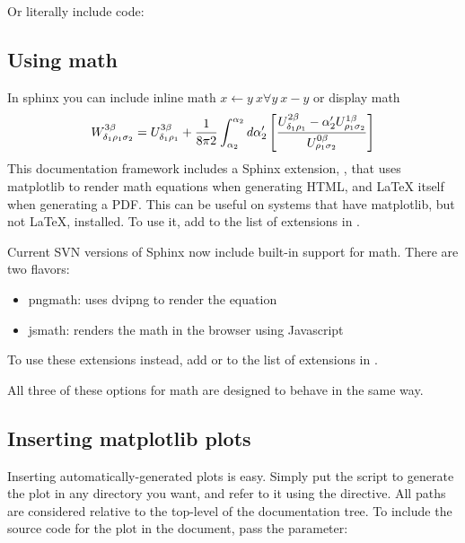 \documentclass[letterpaper,10pt,openany, oneside]{sphinxmanual}
\begin{document}
Or literally include code:


\subsection{Using math}
\label{sample:id5}\label{sample:using-math}
In sphinx you can include inline math $x\leftarrow y\ x\forall
y\ x-y$ or display math
\begin{gather}
\begin{split}W^{3\beta}_{\delta_1 \rho_1 \sigma_2} = U^{3\beta}_{\delta_1 \rho_1} + \frac{1}{8 \pi 2} \int^{\alpha_2}_{\alpha_2} d \alpha^\prime_2 \left[\frac{ U^{2\beta}_{\delta_1 \rho_1} - \alpha^\prime_2U^{1\beta}_{\rho_1 \sigma_2} }{U^{0\beta}_{\rho_1 \sigma_2}}\right]\end{split}\notag
\end{gather}
This documentation framework includes a Sphinx extension,
, that uses matplotlib to render math
equations when generating HTML, and LaTeX itself when generating a
PDF.  This can be useful on systems that have matplotlib, but not
LaTeX, installed.  To use it, add  to the list of
extensions in .

Current SVN versions of Sphinx now include built-in support for math.
There are two flavors:
\begin{itemize}
\item {} 
pngmath: uses dvipng to render the equation

\item {} 
jsmath: renders the math in the browser using Javascript

\end{itemize}

To use these extensions instead, add  or
 to the list of extensions in .

All three of these options for math are designed to behave in the same
way.


\subsection{Inserting matplotlib plots}
\label{sample:inserting-matplotlib-plots}
Inserting automatically-generated plots is easy.  Simply put the script to
generate the plot in any directory you want, and refer to it using the 
directive.  All paths are considered relative to the top-level of the
documentation tree.  To include the source code for the plot in the document,
pass the  parameter:
\end{document}
